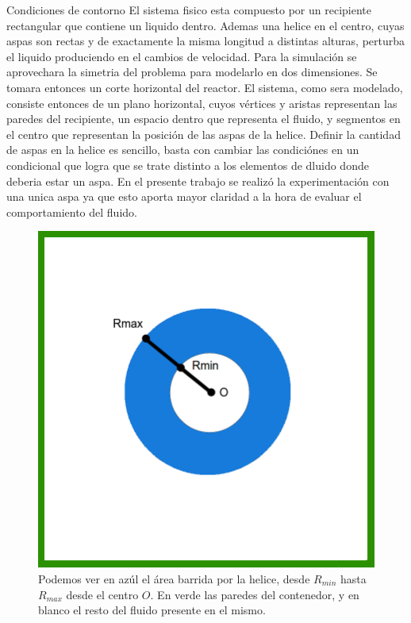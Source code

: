 

\begin{section}{Condiciones de contorno}
El sistema fisico esta compuesto por un recipiente rectangular que contiene un liquido dentro. Ademas una helice en el centro, cuyas aspas son rectas y de exactamente la misma longitud a distintas alturas, perturba el liquido produciendo en el cambios de velocidad. 
Para la simulación se aprovechara la simetria del problema para modelarlo en dos dimensiones. Se tomara entonces un corte horizontal del reactor. El sistema, como sera modelado, consiste entonces de un plano horizontal, cuyos vértices y aristas representan las paredes del recipiente, un espacio dentro que representa el fluido, y segmentos en el centro que representan la posición de las aspas de la helice. Definir la cantidad de aspas en la helice es sencillo, basta con cambiar las condiciónes en un condicional que logra que se trate distinto a los elementos de dluido donde deberia estar un aspa. En el presente trabajo se realizó la experimentación con una unica aspa ya que esto aporta mayor claridad a la hora de evaluar el comportamiento del fluido.
~\\


\begin{figure}[h]
\includegraphics[width=\textwidth/3,height=\textheight/3,keepaspectratio]{figures/border}
\caption{Podemos ver en azúl el área barrida por la helice, desde $R_{min}$ hasta $R_{max}$ desde el centro $O$. En verde las paredes del contenedor, y en blanco el resto del fluido presente en el mismo. }
\label{fig:border}


\end{figure}
\end{section}
